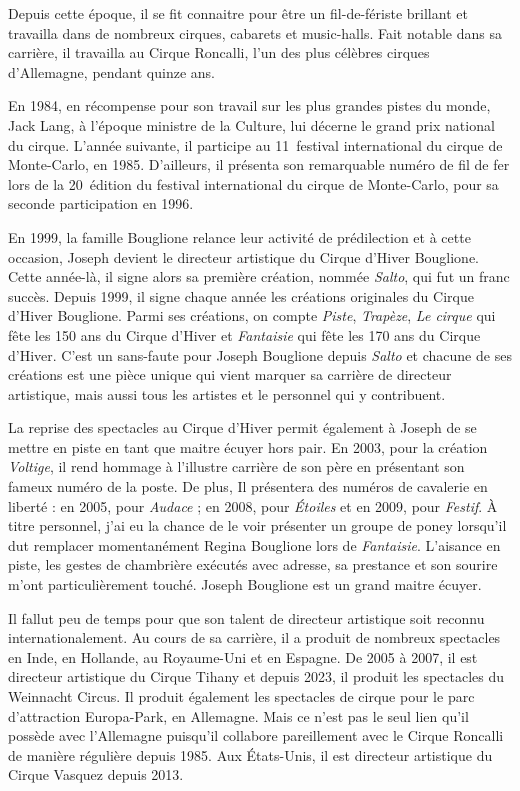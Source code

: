 Depuis cette époque, il se fit connaitre pour être un fil-de-fériste brillant et travailla dans de nombreux cirques, cabarets et music-halls. Fait notable dans sa carrière, il travailla au Cirque Roncalli, l’un des plus célèbres cirques d’Allemagne, pendant quinze ans.

En 1984, en récompense pour son travail sur les plus grandes pistes du monde, Jack Lang, à l’époque ministre de la Culture, lui décerne le grand prix national du cirque. L’année suivante, il participe au 11\ieme~festival international du cirque de Monte-Carlo, en 1985. D’ailleurs, il présenta son remarquable numéro de fil de fer lors de la 20\ieme~édition du festival international du cirque de Monte-Carlo, pour sa seconde participation en 1996.

En 1999, la famille Bouglione relance leur activité de prédilection et à cette occasion, Joseph devient le directeur artistique du Cirque d'Hiver Bouglione. Cette année-là, il signe alors sa première création, nommée \textit{Salto}, qui fut un franc succès. Depuis 1999, il signe chaque année les créations originales du Cirque d’Hiver Bouglione. Parmi ses créations, on compte \textit{Piste}, \textit{Trapèze}, \textit{Le cirque} qui fête les 150 ans du Cirque d'Hiver et \textit{Fantaisie} qui fête les 170 ans du Cirque d’Hiver. C’est un sans-faute pour Joseph Bouglione depuis \textit{Salto} et chacune de ses créations est une pièce unique qui vient marquer sa carrière de directeur artistique, mais aussi tous les artistes et le personnel qui y contribuent.

La reprise des spectacles au Cirque d’Hiver permit également à Joseph de se mettre en piste en tant que maitre écuyer hors pair. En 2003, pour la création \textit{Voltige}, il rend hommage à l’illustre carrière de son père en présentant son fameux numéro de la poste. De plus, Il présentera des numéros de cavalerie en liberté : en 2005, pour \textit{Audace} ; en 2008, pour \textit{Étoiles} et en 2009, pour \textit{Festif}. À titre personnel, j’ai eu la chance de le voir présenter un groupe de poney lorsqu’il dut remplacer momentanément Regina Bouglione lors de \textit{Fantaisie}. L’aisance en piste, les gestes de chambrière exécutés avec adresse, sa prestance et son sourire m’ont particulièrement touché. Joseph Bouglione est un grand maitre écuyer.

Il fallut peu de temps pour que son talent de directeur artistique soit reconnu internationalement. Au cours de sa carrière, il a produit de nombreux spectacles en Inde, en Hollande, au Royaume-Uni et en Espagne. De 2005 à 2007, il est directeur artistique du Cirque Tihany et depuis 2023, il produit les spectacles du Weinnacht Circus. Il produit également les spectacles de cirque pour le parc d'attraction Europa-Park, en Allemagne. Mais ce n’est pas le seul lien qu’il possède avec l’Allemagne puisqu’il collabore pareillement avec le Cirque Roncalli de manière régulière depuis 1985. Aux États-Unis, il est directeur artistique du Cirque Vasquez depuis 2013.

